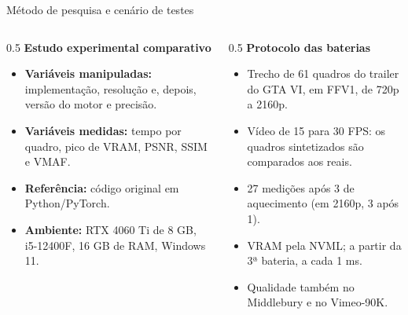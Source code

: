 \documentclass[
    aspectratio=169,
    12pt,
    brazil,
    xcolor=table
]{beamer}
\begin{document}
\begin{frame}{Método de pesquisa e cenário de testes}
  \footnotesize
  \begin{columns}[T]
    \begin{column}{0.5\textwidth}
      \textbf{Estudo experimental comparativo}
      \begin{itemize}
        \item \textbf{Variáveis manipuladas:} implementação, resolução e, depois, versão do motor e precisão.
        \item \textbf{Variáveis medidas:} tempo por quadro, pico de VRAM, PSNR, SSIM e VMAF.
        \item \textbf{Referência:} código original em Python/PyTorch.
        \item \textbf{Ambiente:} RTX 4060 Ti de 8 GB, i5-12400F, 16 GB de RAM, Windows 11.
      \end{itemize}
    \end{column}
    \begin{column}{0.5\textwidth}
      \textbf{Protocolo das baterias}
      \begin{itemize}
        \item Trecho de 61 quadros do trailer do GTA VI, em FFV1, de 720p a 2160p.
        \item Vídeo de 15 para 30 FPS: os quadros sintetizados são comparados aos reais.
        \item 27 medições após 3 de aquecimento (em 2160p, 3 após 1).
        \item VRAM pela NVML; a partir da 3ª bateria, a cada 1 ms.
        \item Qualidade também no Middlebury e no Vimeo-90K.
      \end{itemize}
    \end{column}
  \end{columns}
\end{frame}

\end{document}
